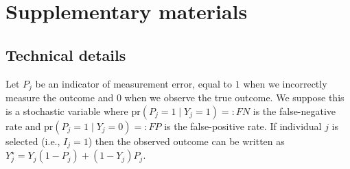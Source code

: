\documentclass[12pt]{article}
\def\pr{\text{pr}}
\begin{document}
\section*{Supplementary materials}

\subsection*{Technical details}

Let $P_j$ be an indicator of measurement error, equal to $1$ when we incorrectly measure the outcome and $0$ when we observe the true outcome. We suppose this is a stochastic variable where $\pr(P_j = 1 \mid Y_j = 1) =: FN$ is the false-negative rate and $\pr(P_j = 1 \mid Y_j = 0) =: FP$ is the false-positive rate.  If individual $j$ is selected (i.e., $I_j = 1$) then the observed outcome can be written as $Y_j^{\star} = Y_j(1-P_j) + (1-Y_j) P_j$.
\end{document}
